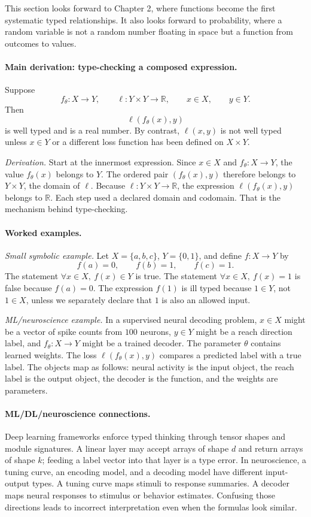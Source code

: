 This section looks forward to Chapter 2, where functions become the first systematic typed relationships. It also looks forward to probability, where a random variable is not a random number floating in space but a function from outcomes to values.

\paragraph{Main derivation: type-checking a composed expression.}
Suppose
\[
f_\theta:X\to Y,\qquad \ell:Y\times Y\to\mathbb{R},\qquad x\in X,\qquad y\in Y.
\]
Then
\[
\ell(f_\theta(x),y)
\]
is well typed and is a real number. By contrast, \(\ell(x,y)\) is not well typed unless \(x\in Y\) or a different loss function has been defined on \(X\times Y\).

\emph{Derivation.} Start at the innermost expression. Since \(x\in X\) and \(f_\theta:X\to Y\), the value \(f_\theta(x)\) belongs to \(Y\). The ordered pair \((f_\theta(x),y)\) therefore belongs to \(Y\times Y\), the domain of \(\ell\). Because \(\ell:Y\times Y\to\mathbb{R}\), the expression \(\ell(f_\theta(x),y)\) belongs to \(\mathbb{R}\). Each step used a declared domain and codomain. That is the mechanism behind type-checking.

\paragraph{Worked examples.}
\emph{Small symbolic example.} Let \(X=\{a,b,c\}\), \(Y=\{0,1\}\), and define \(f:X\to Y\) by
\[
f(a)=0,\qquad f(b)=1,\qquad f(c)=1.
\]
The statement \(\forall x\in X,\ f(x)\in Y\) is true. The statement \(\forall x\in X,\ f(x)=1\) is false because \(f(a)=0\). The expression \(f(1)\) is ill typed because \(1\in Y\), not \(1\in X\), unless we separately declare that \(1\) is also an allowed input.

\emph{ML/neuroscience example.} In a supervised neural decoding problem, \(x\in X\) might be a vector of spike counts from \(100\) neurons, \(y\in Y\) might be a reach direction label, and \(f_\theta:X\to Y\) might be a trained decoder. The parameter \(\theta\) contains learned weights. The loss \(\ell(f_\theta(x),y)\) compares a predicted label with a true label. The objects map as follows: neural activity is the input object, the reach label is the output object, the decoder is the function, and the weights are parameters.

\paragraph{ML/DL/neuroscience connections.}
Deep learning frameworks enforce typed thinking through tensor shapes and module signatures. A linear layer may accept arrays of shape \(d\) and return arrays of shape \(k\); feeding a label vector into that layer is a type error. In neuroscience, a tuning curve, an encoding model, and a decoding model have different input-output types. A tuning curve maps stimuli to response summaries. A decoder maps neural responses to stimulus or behavior estimates. Confusing those directions leads to incorrect interpretation even when the formulas look similar.


